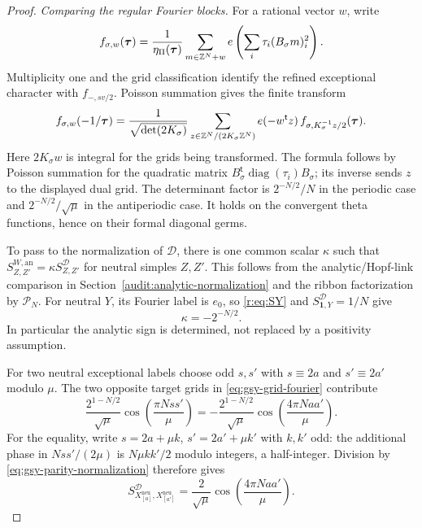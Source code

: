 \documentclass[11pt,a4paper]{article}
\numberwithin{equation}{section}
\theoremstyle{definition}\newtheorem{definition}[theorem]{Definition}
\theoremstyle{remark}\newtheorem{remark}[theorem]{Remark}
\newcommand{\one}{\mathbf1}\newcommand{\B}{\mathcal B}\newcommand{\W}{W_N}
\newcommand{\diag}{\operatorname{diag}}\renewcommand{\Vec}{\operatorname{Vec}}
\begin{document}
\begin{proof}
\emph{Comparing the regular Fourier blocks.}
For a rational vector $w$, write
\[
 f_{\sigma,w}(\boldsymbol\tau)
 =\frac1{\eta_\Pi(\boldsymbol\tau)}
   \sum_{m\in\mathbb Z^N+w}
       e\left(\sum_i\tau_i(B_\sigma m)_i^2\right).
\]
Multiplicity one and the grid classification identify the refined
exceptional character with $f_{-,sv/2}$. Poisson summation gives
the finite transform
\begin{equation}\label{eq:gsy-grid-fourier}
 f_{\sigma,w}(-1/\boldsymbol\tau)
 =\frac1{\sqrt{\det(2K_\sigma)}}
  \sum_{z\in\mathbb Z^N/(2K_\sigma\mathbb Z^N)}
    e(-w^{\mathsf t}z)\,
    f_{\sigma,K_\sigma^{-1}z/2}(\boldsymbol\tau).
\end{equation}
Here $2K_\sigma w$ is integral for the grids being transformed.
The formula follows by Poisson summation for the quadratic matrix
$B_\sigma^{\mathsf t}\diag(\tau_i)B_\sigma$; its inverse sends
$z$ to the displayed dual grid. The determinant factor is
$2^{-N/2}/N$ in the periodic case and
$2^{-N/2}/\sqrt\mu$ in the antiperiodic case.
It holds on the convergent theta functions, hence on their formal
diagonal germs.

To pass to the normalization of $\mathcal D$, there is one common
scalar $\kappa$ such that
$S^{W,\mathrm{an}}_{Z,Z'}=\kappa S^{\mathcal D}_{Z,Z'}$ for neutral
simples $Z,Z'$. This follows from the analytic/Hopf-link comparison
in Section~\ref{audit:analytic-normalization} and the ribbon
factorization by $\mathcal P_N$. For neutral $Y$, its Fourier label
is $e_0$, so \eqref{r:eq:SY} and $S^{\mathcal D}_{\one,Y}=1/N$ give
\begin{equation}\label{eq:gsy-parity-normalization}
                         \kappa=-2^{-N/2}.
\end{equation}
In particular the analytic sign is determined, not replaced by a
positivity assumption.

For two neutral exceptional labels choose odd $s,s'$ with
$s\equiv2a$ and $s'\equiv2a'$ modulo $\mu$. The two opposite
target grids in \eqref{eq:gsy-grid-fourier} contribute
\[
 \frac{2^{1-N/2}}{\sqrt\mu}
       \cos\left(\frac{\pi Nss'}\mu\right)
 =-\frac{2^{1-N/2}}{\sqrt\mu}
       \cos\left(\frac{4\pi Naa'}\mu\right).
\]
For the equality, write $s=2a+\mu k$, $s'=2a'+\mu k'$ with
$k,k'$ odd: the additional phase in $Nss'/(2\mu)$ is
$N\mu kk'/2$ modulo integers, a half-integer. Division by
\eqref{eq:gsy-parity-normalization} therefore gives
\begin{equation}\label{eq:gsy-natural-XX}
 S^{\mathcal D}_{X^{\mathrm{neu}}_{[a]},X^{\mathrm{neu}}_{[a']}}
   =\frac2{\sqrt\mu}\cos\left(\frac{4\pi Naa'}\mu\right).
\end{equation}


\end{proof}
\end{document}

